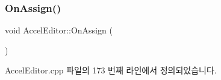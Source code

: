 \mbox{\label{class_accel_editor_ad33ae69dcc262dd73595cb33d82c209e}} 
\subsubsection{\texorpdfstring{On\+Assign()}{OnAssign()}}
{\footnotesize\ttfamily void Accel\+Editor\+::\+On\+Assign (\begin{DoxyParamCaption}{ }\end{DoxyParamCaption})\hspace{0.3cm}{\ttfamily [protected]}}



Accel\+Editor.\+cpp 파일의 173 번째 라인에서 정의되었습니다.


